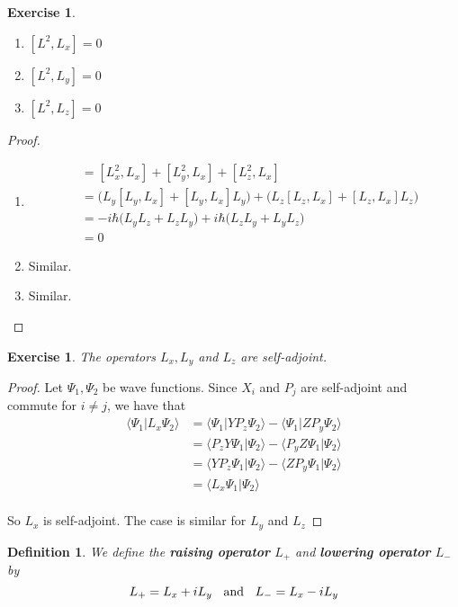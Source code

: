 \documentclass[12pt]{amsart}
\newtheorem{defn}[thm]{Definition}
\newtheorem{ex}[thm]{Exercise}
\renewcommand{\r}{\rangle}
\renewcommand{\l}{\langle}
\begin{document}
\begin{ex}\
\begin{enumerate}
\item $[L^2, L_x] = 0$
\item $[L^2, L_y] = 0$
\item $[L^2, L_z] = 0$
\end{enumerate}
\end{ex}

\begin{proof}\
\begin{enumerate}
\item 
\begin{align*}
[L^2, L_x] 
&= [L_x^2, L_x] + [L_y^2, L_x]+ [L_z^2,L_x]\\
&= \big(L_y[L_y,L_x]+[L_y,L_x]L_y\big) + \big(L_z[L_z,L_x]+[L_z,L_x]L_z\big)\\
&=-i \hbar \big(L_yL_z+ L_zL_y\big) + i\hbar\big( L_zL_y+L_yL_z\big)\\
&=0
\end{align*}
\item Similar.
\item Similar.
\end{enumerate}
\end{proof}

\begin{ex} The operators $L_x,L_y$ and $L_z$ are self-adjoint.
\end{ex}

\begin{proof} Let $\Psi_1, \Psi_2$ be wave functions. Since $X_i$ and $P_j$ are self-adjoint and commute for $i \neq j$, we have that
\begin{align*}
\l \Psi_1 \vert L_x \Psi_2\r
&= \l \Psi_1 \vert YP_z \Psi_2\r - \l \Psi_1 \vert ZP_y \Psi_2\r\\
&= \l P_zY\Psi_1 \vert  \Psi_2\r - \l P_yZ \Psi_1 \vert \Psi_2\r \\
&= \l YP_z \Psi_1 \vert  \Psi_2\r - \l ZP_y \Psi_1 \vert \Psi_2\r \\
&= \l L_x\Psi_1 \vert \Psi_2\r 
\end{align*} \\
So $L_x$ is self-adjoint. The case is similar for $L_y$ and $L_z$
\end{proof}

\begin{defn}
We define the \textbf{raising operator} $L_+$ and \textbf{lowering operator} $L_-$ by $$L_+ = L_x +iL_y \hspace{2mm}\text{ and } \hspace{2mm} L_- = L_x - iL_y$$
\end{defn}
\end{document}
